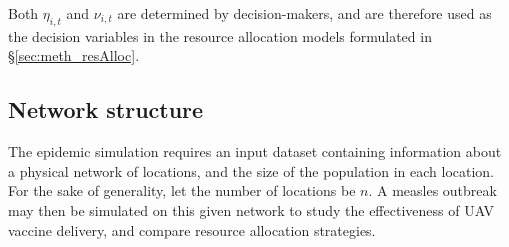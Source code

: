 Both $\eta_{i,t}$ and $\nu_{i,t}$ are determined by decision-makers, and are therefore used as the decision variables in the resource allocation models formulated in \S \ref{sec:meth_resAlloc}.

\subsection{Network structure} %
\label{sec:meth_netLoc}
The epidemic simulation requires an input dataset containing information about a physical network of locations, and the size of the population in each location. For the sake of generality, let the number of locations be $n$. A measles outbreak may then be simulated on this given network to study the effectiveness of UAV vaccine delivery, and compare resource allocation strategies. 


